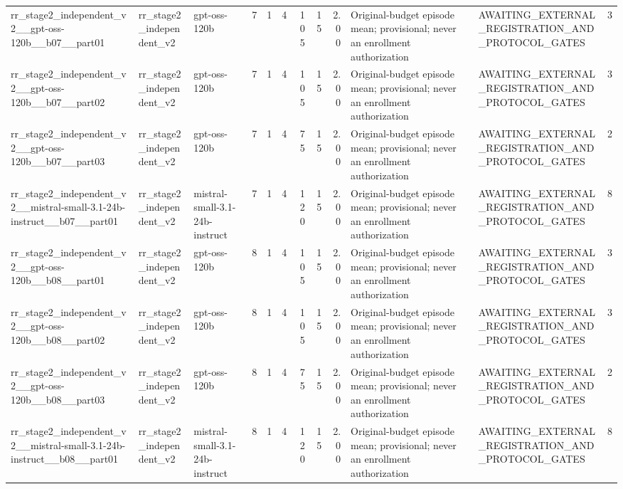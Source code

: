 \begin{tabular}{lllrrrrrrllr}
rr\_stage2\_independent\_v2\_\_gpt-oss-120b\_\_b07\_\_part01 & rr\_stage2\_independent\_v2 & gpt-oss-120b & 7 & 1 & 4 & 105 & 15 & 2.00 & Original-budget episode mean; provisional; never an enrollment authorization & AWAITING\_EXTERNAL\_REGISTRATION\_AND\_PROTOCOL\_GATES & 3 \\
rr\_stage2\_independent\_v2\_\_gpt-oss-120b\_\_b07\_\_part02 & rr\_stage2\_independent\_v2 & gpt-oss-120b & 7 & 1 & 4 & 105 & 15 & 2.00 & Original-budget episode mean; provisional; never an enrollment authorization & AWAITING\_EXTERNAL\_REGISTRATION\_AND\_PROTOCOL\_GATES & 3 \\
rr\_stage2\_independent\_v2\_\_gpt-oss-120b\_\_b07\_\_part03 & rr\_stage2\_independent\_v2 & gpt-oss-120b & 7 & 1 & 4 & 75 & 15 & 2.00 & Original-budget episode mean; provisional; never an enrollment authorization & AWAITING\_EXTERNAL\_REGISTRATION\_AND\_PROTOCOL\_GATES & 2 \\
rr\_stage2\_independent\_v2\_\_mistral-small-3.1-24b-instruct\_\_b07\_\_part01 & rr\_stage2\_independent\_v2 & mistral-small-3.1-24b-instruct & 7 & 1 & 4 & 120 & 15 & 2.00 & Original-budget episode mean; provisional; never an enrollment authorization & AWAITING\_EXTERNAL\_REGISTRATION\_AND\_PROTOCOL\_GATES & 8 \\
rr\_stage2\_independent\_v2\_\_gpt-oss-120b\_\_b08\_\_part01 & rr\_stage2\_independent\_v2 & gpt-oss-120b & 8 & 1 & 4 & 105 & 15 & 2.00 & Original-budget episode mean; provisional; never an enrollment authorization & AWAITING\_EXTERNAL\_REGISTRATION\_AND\_PROTOCOL\_GATES & 3 \\
rr\_stage2\_independent\_v2\_\_gpt-oss-120b\_\_b08\_\_part02 & rr\_stage2\_independent\_v2 & gpt-oss-120b & 8 & 1 & 4 & 105 & 15 & 2.00 & Original-budget episode mean; provisional; never an enrollment authorization & AWAITING\_EXTERNAL\_REGISTRATION\_AND\_PROTOCOL\_GATES & 3 \\
rr\_stage2\_independent\_v2\_\_gpt-oss-120b\_\_b08\_\_part03 & rr\_stage2\_independent\_v2 & gpt-oss-120b & 8 & 1 & 4 & 75 & 15 & 2.00 & Original-budget episode mean; provisional; never an enrollment authorization & AWAITING\_EXTERNAL\_REGISTRATION\_AND\_PROTOCOL\_GATES & 2 \\
rr\_stage2\_independent\_v2\_\_mistral-small-3.1-24b-instruct\_\_b08\_\_part01 & rr\_stage2\_independent\_v2 & mistral-small-3.1-24b-instruct & 8 & 1 & 4 & 120 & 15 & 2.00 & Original-budget episode mean; provisional; never an enrollment authorization & AWAITING\_EXTERNAL\_REGISTRATION\_AND\_PROTOCOL\_GATES & 8 \\

\end{tabular}
